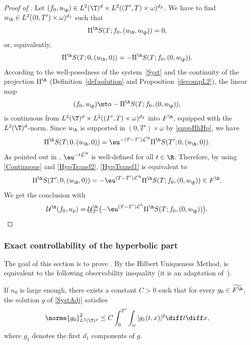 \begin{proof}[Proof of ]
Let $(f_0,u_{\p})\in L^2(\T)^{d} \times L^2((T',T)\times\omega)^{d_2} $. We have to find $u_{\h} \in L^2((0,T')\times\omega)^{d_1}$ such that
\[
\Pi^{\h} S(T;f_0, (u_{\h},u_{\p})) = 0,
\]
or, equivalently,
\begin{equation}
\label{HypTransf1}
\Pi^{\h} S(T;0, (u_{\h},0))= -\Pi^{\h} S(T;f_0, (0,u_{\p})).
\end{equation}
According to the well-posedness of the system~\eqref{Syst} and the continuity of the projection $\Pi^\h$ (Definition~\ref{def:solution} and Proposition~\ref{decompL2}), the linear map
\begin{equation}
\label{Continuous}
(f_0, u_{\p}) \mto -\Pi^{\h} S(T;f_0, (0,u_{\p})),
\end{equation}
is continuous from $L^2(\T)^{d} \times L^2((T',T)\times\omega)^{d_2}$ into $F^{\h}$, equipped with the $L^2(\T)^d$-norm. Since $u_{\h}$ is supported in $(0,T')\times\omega$ by \eqref{suppHhHp}, we have
\begin{equation}
\label{HypTransf2}
\Pi^{\h} S(T;0, (u_{\h},0))= \eu^{-(T-T')\mathcal{L}^{\h}}\Pi^{\h} S(T';0, (u_{\h},0)).
\end{equation}
As pointed out in , $\eu^{-t\mathcal{L}^{\h}}$ is well-defined for all $t \in \R$. Therefore, by using \eqref{Continuous} and \eqref{HypTransf2}, \eqref{HypTransf1} is equivalent to
\begin{equation}
\label{HypTransf3}
\Pi^{\h} S(T';0, (u_{\h},0))= -\eu^{(T-T')\mathcal{L}^{\h}}\Pi^{\h} S(T;f_0, (0,u_{\p})) \in F^{\h}.
\end{equation}
We get the conclusion with
\[
\mathcal{U}^\h(f_0,u_p) = \underline{\mathcal{U}}_{T'}^{\h} \bigl(-\eu^{(T-T')\mathcal{L}^{h}}\Pi^{\h} S(T;f_0, (0,u_{\p})) \bigr).\qedhere
\]
\end{proof}

\subsubsection{Exact controllability of the hyperbolic part} \label{subsec:Hyp_NC}

The goal of this section is to prove .
By the Hilbert Uniqueness Method,  is equivalent to the following observability inequality (it is an adaptation of~\cite[Th.\,2.42]{coron_2007}).
\begin{prop}
\label{ObsHyp}
If $n_0$ is large enough, there exists a constant $C>0$ such that for every $g_0 \in \widetilde{F^{\h}}$, the solution $g$ of \eqref{SystAdj} satisfies
\begin{equation}
\label{inobsHyp}
\norme{g_0}_{L^2(\T)^{d}}^{2} \leq C \int_{0}^{T'} \int_{\omega} |g_{1}(t,x)|^{2} \diff t \diff x,
\end{equation}
where $g_{1}$ denotes the first $d_1$ components of $g$.
\end{prop}

